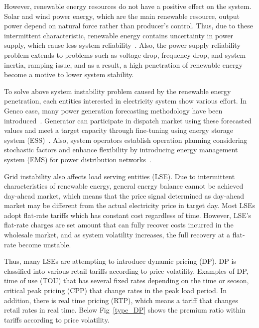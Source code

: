 \documentclass[journal]{IEEEtran} %
\begin{document}
However, renewable energy resources do not have a positive effect on the system.  Solar and wind power energy, which are the main renewable resource, output power depend on natural force rather than producer's control. Thus, due to these intermittent characteristic, renewable energy contains uncertainty in power supply, which cause less system reliability~\cite{zahedi2011review}. Also, the power supply reliability problem extends to problems such as voltage drop, frequency drop, and system inertia, ramping issue, and as a result, a high penetration of renewable energy become a motive to lower system stability\cite{santoso2012electrical, dreidy2017inertia, wang2016enhancing}.

To solve above system instability problem caused by the renewable energy penetration, each entities interested in electricity system show various effort. In Genco case, many power generation forecasting methodology have been introduced~\cite{lee2013short, lee2016probabilistic, agoua2017short}. Generator can participate in dispatch market using these forecasted values and meet a target capacity through fine-tuning using energy storage system (ESS)~\cite{shim2013synergistic}. Also, system operators establish operation planning considering stochastic factors and enhance flexibility by introducing energy management system (EMS) for power distribution networks~\cite{palma2013microgrid}.

Grid instability also affects load serving entities (LSE). Due to intermittent characteristics of renewable energy, general energy balance cannot be achieved day-ahead market, which means that the price signal determined as day-ahead market may be different from the actual electricity price in target day. Most LSEs adopt flat-rate tariffs which has constant cost regardless of time. However, LSE's flat-rate charges are set amount that can fully recover costs incurred in the wholesale market, and as system volatility increases, the full recovery at a flat-rate become unstable.

Thus, many LSEs are attempting to introduce dynamic pricing (DP). DP is classified into various retail tariffs according to price volatility. Examples of DP, time of use (TOU) that has several fixed rates depending on the time or seoson, critical peak pricing (CPP) that change rates in the peak load period. In addition, there is real time pricing (RTP), which means a tariff that changes retail rates in real time. Below Fig~\ref{type_DP} shows the premium ratio within tariffs according to price volatility.
\end{document}
